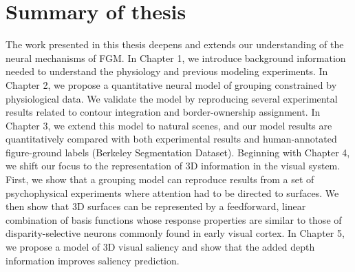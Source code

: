 \section{Summary of thesis}
The work presented in this thesis deepens and extends our understanding of the neural mechanisms of FGM. In Chapter 1, we introduce background information needed to understand the physiology and previous modeling experiments. In Chapter 2, we propose a quantitative neural model of grouping constrained by physiological data. We validate the model by reproducing several experimental results related to contour integration and border-ownership assignment. In Chapter 3, we extend this model to natural scenes, and our model results are quantitatively compared with both experimental results and human-annotated figure-ground labels (Berkeley Segmentation Dataset). Beginning with Chapter 4, we shift our focus to the representation of 3D information in the visual system. First, we show that a grouping model can reproduce results from a set of psychophysical experiments where attention had to be directed to surfaces. We then show that 3D surfaces can be represented by a feedforward, linear combination of basis functions whose response properties are similar to those of disparity-selective neurons commonly found in early visual cortex. In Chapter 5, we propose a model of 3D visual saliency and show that the added depth information improves saliency prediction.

